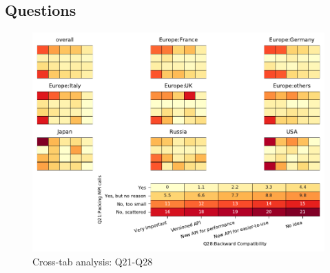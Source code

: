 
\subsection{Questions}


\begin{figure}
\begin{center}
\includegraphics[width=12cm]{../pdfs/Q21-Q28.pdf}
\caption{Cross-tab analysis: Q21-Q28}
\label{fig:Q21-Q28}
\end{center}
\end{figure}
